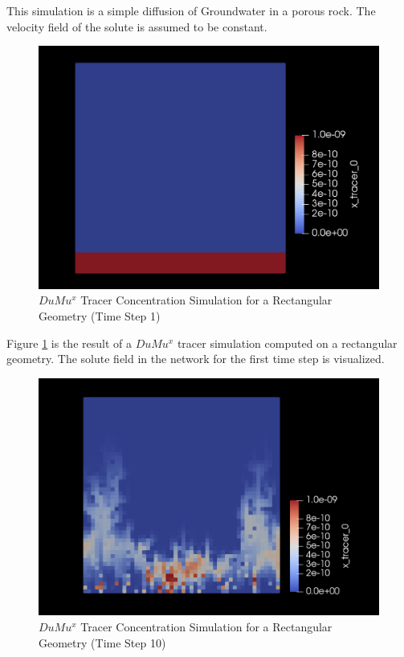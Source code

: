 This simulation is a simple diffusion of Groundwater in a porous rock. The velocity field of the solute is assumed to be constant.
\begin{figure}[h]
\centering
\includegraphics[width=162mm]{tracer_1}
\caption{\footnotesize $DuMu^x$ Tracer Concentration Simulation for a Rectangular Geometry (Time Step 1)}
\label{fig:tracer_1}
\end{figure}
Figure \ref{fig:tracer_1} is the result of a $DuMu^x$ tracer simulation computed on a rectangular geometry. The solute field in the network for the first time step is visualized.\\
\begin{figure}[h]
\centering
\includegraphics[width=162mm]{tracer_2}
\caption{\footnotesize $DuMu^x$ Tracer Concentration Simulation for a Rectangular Geometry (Time Step 10)}
\label{fig:tracer_2}
\end{figure}
